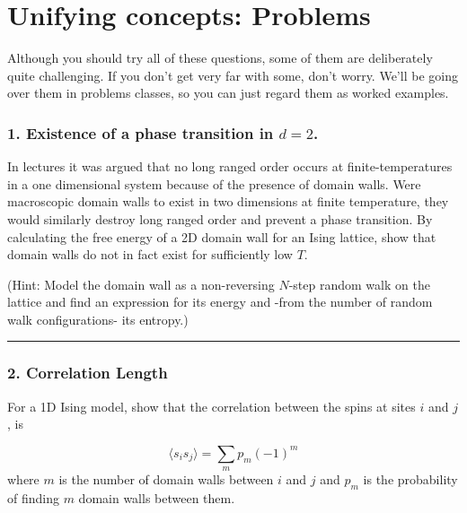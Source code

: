 \documentclass[
  letterpaper,
  DIV=11,
  numbers=noendperiod]{scrreprt}
\begin{document}
\chapter*{Unifying concepts: Problems}\label{problems}


Although you should try all of these questions, some of them are
deliberately quite challenging. If you don't get very far with some,
don't worry. We'll be going over them in problems classes, so you can
just regard them as worked examples.

\subsection*{\texorpdfstring{1. Existence of a phase transition in
\(d=2\).}{1. Existence of a phase transition in d=2.}}\label{existence-of-a-phase-transition-in-d2.}

In lectures it was argued that no long ranged order occurs at
finite-temperatures in a one dimensional system because of the presence
of domain walls. Were macroscopic domain walls to exist in two
dimensions at finite temperature, they would similarly destroy long
ranged order and prevent a phase transition. By calculating the free
energy of a 2D domain wall for an Ising lattice, show that domain walls
do not in fact exist for sufficiently low \(T\).

(Hint: Model the domain wall as a non-reversing \(N\)-step random walk
on the lattice and find an expression for its energy and -from the
number of random walk configurations- its entropy.)

\begin{center}\rule{0.5\linewidth}{0.5pt}\end{center}

\subsection*{2. Correlation Length}\label{correlation-length}

For a 1D Ising model, show that the correlation between the spins at
sites \(i\) and \(j\), is

\[\langle s_i s_j\rangle =\sum_m p_m(-1)^m\] where \(m\) is the number
of domain walls between \(i\) and \(j\) and \(p_m\) is the probability
of finding \(m\) domain walls between them.
\end{document}
